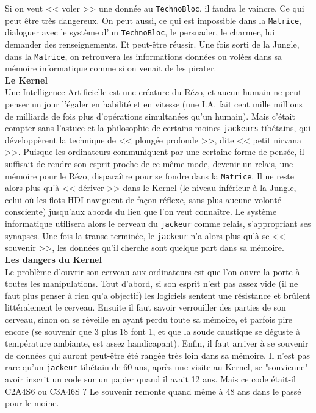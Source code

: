 \documentclass[11pt,twoside,a4paper]{article}
\begin{document}
\begin{multicols}{3}
{	Si on veut << voler >> une donn{\'e}e au \texttt{TechnoBloc}, il faudra le vaincre. Ce qui peut {\^e}tre tr{\`e}s dangereux. On peut aussi, ce qui est impossible dans la \texttt{Matrice}, dialoguer avec le syst{\`e}me d'un \texttt{TechnoBloc}, le persuader, le charmer, lui demander des renseignements. Et peut-{\^e}tre r{\'e}ussir. Une fois sorti de la Jungle, dans la \texttt{Matrice}, on retrouvera les informations donn{\'e}es ou vol{\'e}es dans sa m{\'e}moire informatique comme si on venait de les pirater.~\\
	
	\textbf{\Large Le Kernel}~\\
	
	Une Intelligence Artificielle est une cr{\'e}ature du R{\'e}zo, et aucun humain ne peut penser un jour l'{\'e}galer en habilit{\'e} et en vitesse (une I.A. fait cent mille millions de milliards de fois plus d'op{\'e}rations simultan{\'e}es qu'un humain). Mais c'{\'e}tait compter sans l'astuce et la philosophie de certains moines \texttt{jackeurs} tib{\'e}tains, qui d{\'e}velopp{\`e}rent la technique de << plong{\'e}e profonde >>, dite << petit nirvana >>. Puisque les ordinateurs communiquent par une certaine forme de pens{\'e}e, il suffisait de rendre son esprit proche de ce m{\^e}me mode, devenir un relais, une m{\'e}moire pour le R{\'e}zo, dispara{\^i}tre pour se fondre dans la \texttt{Matrice}. Il ne reste alors plus qu'{\`a} << d{\'e}river >> dans le Kernel (le niveau inf{\'e}rieur {\`a} la Jungle, celui o{\`u} les flots HDI naviguent de fa\c{c}on r{\'e}flexe, sans plus aucune volont{\'e} consciente) jusqu'aux abords du lieu que l'on veut conna{\^i}tre. Le syst{\`e}me informatique utilisera alors le cerveau du \texttt{jackeur} comme relais, s'appropriant ses synapses. Une fois la transe termin{\'e}e, le \texttt{jackeur} n'a alors plus qu'{\`a} se << souvenir >>, les donn{\'e}es qu'il cherche sont quelque part dans sa m{\'e}moire.~\\
	
	\textbf{\large Les dangers du Kernel}~\\
	
	Le probl{\`e}me d'ouvrir son cerveau aux ordinateurs est que l'on ouvre la porte {\`a} toutes les manipulations. Tout d'abord, si son esprit n'est pas assez vide (il ne faut plus penser {\`a} rien qu'a objectif) les logiciels sentent une r{\'e}sistance et br{\^u}lent litt{\'e}ralement le cerveau. Ensuite il faut savoir verrouiller des parties de son cerveau, sinon on se r{\'e}veille en ayant perdu toute sa m{\'e}moire, et parfois pire encore (se souvenir que 3 plus 18 font 1, et que la soude caustique se d{\'e}guste {\`a} temp{\'e}rature ambiante, est assez handicapant). Enfin, il faut arriver {\`a} se souvenir de donn{\'e}es qui auront peut-{\^e}tre {\'e}t{\'e} rang{\'e}e tr{\`e}s loin dans sa m{\'e}moire. Il n'est pas rare qu'un \texttt{jackeur} tib{\'e}tain de 60 ans, apr{\`e}s une visite au Kernel, se "souvienne" avoir inscrit un code sur un papier quand il avait 12 ans. Mais ce code {\'e}tait-il C2A4S6 ou C3A46S ? Le souvenir remonte quand m{\^e}me {\`a} 48 ans dans le pass{\'e} pour le moine.~\\
	
}
\end{multicols}
\end{document}
